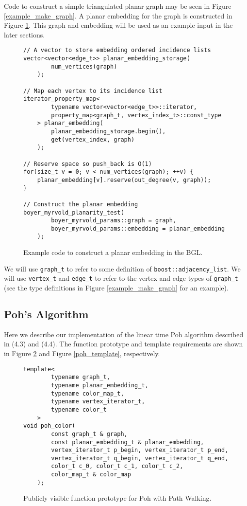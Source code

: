 \documentclass[letterpaper, 12pt]{article}
\theoremstyle{thm}
\begin{document}
Code to construct a simple triangulated planar graph may be seen in Figure
\ref{example_make_graph}. A planar embedding for the graph is constructed
in Figure \ref{example_embed_graph}. 
This graph and embedding will be used as an example input in the later sections.

\begin{figure}
\begin{lstlisting}[frame=single]
// A vector to store embedding ordered incidence lists
vector<vector<edge_t>> planar_embedding_storage(
        num_vertices(graph)
    );

// Map each vertex to its incidence list
iterator_property_map<
        typename vector<vector<edge_t>>::iterator, 
        property_map<graph_t, vertex_index_t>::const_type
    > planar_embedding(
        planar_embedding_storage.begin(),
        get(vertex_index, graph)
    );

// Reserve space so push_back is O(1)
for(size_t v = 0; v < num_vertices(graph); ++v) {
    planar_embedding[v].reserve(out_degree(v, graph));
}

// Construct the planar embedding
boyer_myrvold_planarity_test(
        boyer_myrvold_params::graph = graph,
        boyer_myrvold_params::embedding = planar_embedding
    );
\end{lstlisting}
\caption{Example code to construct a planar embedding in the BGL.}
\label{example_embed_graph}
\end{figure}

We will use \texttt{graph\_t} to refer to some definition of
\texttt{boost::adjacency\_list}. We will use \texttt{vertex\_t} and \texttt{edge\_t}
to refer to the vertex and edge types of \texttt{graph\_t} (see the type
definitions in Figure \ref{example_make_graph} for an example).

\subsection{Poh's Algorithm}

Here we describe our implementation of the linear time Poh algorithm
described in (4.3) and (4.4). The
function prototype and template requirements are shown
in Figure \ref{poh_prototype} and Figure \ref{poh_template}, respectively.

\begin{figure}
\begin{lstlisting}[frame=single]
template<
        typename graph_t,
        typename planar_embedding_t,
        typename color_map_t,
        typename vertex_iterator_t,
        typename color_t
    >
void poh_color(
        const graph_t & graph,
        const planar_embedding_t & planar_embedding,
        vertex_iterator_t p_begin, vertex_iterator_t p_end,
        vertex_iterator_t q_begin, vertex_iterator_t q_end,
        color_t c_0, color_t c_1, color_t c_2,
        color_map_t & color_map
    );
\end{lstlisting}
\caption{Publicly visible function prototype for Poh with Path Walking.}
\label{poh_prototype}
\end{figure}
\end{document}
